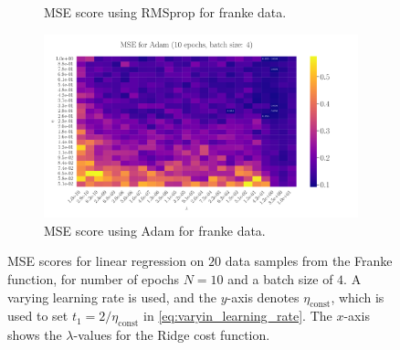 \documentclass[%
reprint,s
amsmath,amssymb,
aps,
]{revtex4-2}
\begin{document}
\begin{figure}
\begin{subfigure}{0.41\textwidth}
		\caption{MSE score using RMSprop for franke data.}
		\label{fig:LinReg25x25_epoch100_bacthS50}
	\end{subfigure}
	\hfill
	\begin{subfigure}{0.41\textwidth}
		\includegraphics[width=\textwidth]{Figures/LinRegAdam_25x25_epoch10_batchS4_zoomed.pdf}
		\caption{MSE score using Adam for franke data.}
		\label{fig:LinReg25x25_epoch100_bacthS50_zoomed}
	\end{subfigure}
	\caption{MSE scores for linear regression on \(20\) data samples from the Franke function, for number of epochs \(N=10\) and a batch size of \(4\). A varying learning rate is used, and the \(y\)-axis denotes \(\eta_{\text{const}}\), which is used to set \(t_1=2/\eta_{\text{const}}\) in \eqref{eq:varyin_learning_rate}. The \(x\)-axis shows the \(\lambda\)-values for the Ridge cost function.}
	\label{fig:LinReg}
\end{figure}
\end{document}
